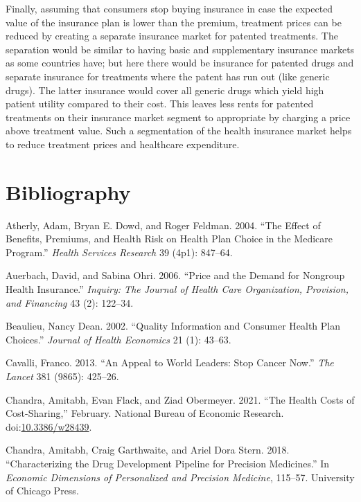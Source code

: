 \documentclass[a4paper,12pt]{article}
\begin{document}
Finally, assuming that consumers stop buying insurance in case the expected value of the insurance plan is lower than the premium, treatment prices can be reduced by creating a separate insurance market for patented treatments. The separation would be similar to having basic and supplementary insurance markets as some countries have; but here there would be insurance for patented drugs and separate insurance for treatments  where the patent has run out (like generic drugs). The latter insurance would cover all generic drugs which yield high patient utility compared to their cost. This leaves less rents for patented treatments on their insurance market segment to appropriate by charging a price above treatment value. Such a segmentation of the health insurance market helps to reduce treatment prices and healthcare expenditure.

\section{Bibliography}
\label{sec:orgce0821b}

\hypertarget{citeproc_bib_item_1}{Atherly, Adam, Bryan E. Dowd, and Roger Feldman. 2004. “The Effect of Benefits, Premiums, and Health Risk on Health Plan Choice in the Medicare Program.” \textit{Health Services Research} 39 (4p1): 847–64.}

\hypertarget{citeproc_bib_item_2}{Auerbach, David, and Sabina Ohri. 2006. “Price and the Demand for Nongroup Health Insurance.” \textit{Inquiry: The Journal of Health Care Organization, Provision, and Financing} 43 (2): 122–34.}

\hypertarget{citeproc_bib_item_3}{Beaulieu, Nancy Dean. 2002. “Quality Information and Consumer Health Plan Choices.” \textit{Journal of Health Economics} 21 (1): 43–63.}

\hypertarget{citeproc_bib_item_4}{Cavalli, Franco. 2013. “An Appeal to World Leaders: Stop Cancer Now.” \textit{The Lancet} 381 (9865): 425–26.}

\hypertarget{citeproc_bib_item_5}{Chandra, Amitabh, Evan Flack, and Ziad Obermeyer. 2021. “The Health Costs of Cost-Sharing,” February. National Bureau of Economic Research. doi:\href{https://doi.org/10.3386/w28439}{10.3386/w28439}.}

\hypertarget{citeproc_bib_item_6}{Chandra, Amitabh, Craig Garthwaite, and Ariel Dora Stern. 2018. “Characterizing the Drug Development Pipeline for Precision Medicines.” In \textit{Economic Dimensions of Personalized and Precision Medicine}, 115–57. University of Chicago Press.}
\end{document}
